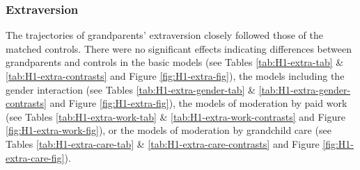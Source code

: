 \documentclass[
  english,
  man,floatsintext]{apa7}
\begin{document}
\hypertarget{extraversion}{%
\subsubsection{Extraversion}\label{extraversion}}

The trajectories of grandparents' extraversion closely followed those of the matched controls. There were no significant effects indicating differences between grandparents and controls in the basic models (see Tables \ref{tab:H1-extra-tab} \& \ref{tab:H1-extra-contrasts} and Figure \ref{fig:H1-extra-fig}), the models including the gender interaction (see Tables \ref{tab:H1-extra-gender-tab} \& \ref{tab:H1-extra-gender-contrasts} and Figure \ref{fig:H1-extra-fig}), the models of moderation by paid work (see Tables \ref{tab:H1-extra-work-tab} \& \ref{tab:H1-extra-work-contrasts} and Figure \ref{fig:H1-extra-work-fig}), or the models of moderation by grandchild care (see Tables \ref{tab:H1-extra-care-tab} \& \ref{tab:H1-extra-care-contrasts} and Figure \ref{fig:H1-extra-care-fig}).
\end{document}
